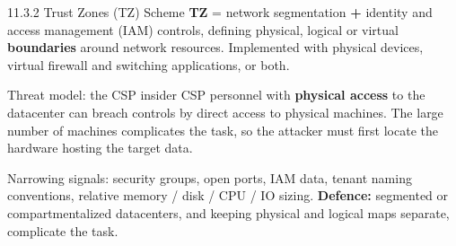 \documentclass[11pt,aspectratio=169]{beamer}
\newcommand{\kw}[1]{\textbf{\color{accent}#1}}
\begin{document}
\begin{frame}{11.3.2 Trust Zones (TZ) Scheme}
  \small
  \kw{TZ} = network segmentation \textbf{+} identity and access management
  (IAM) controls, defining physical, logical or virtual \kw{boundaries} around
  network resources. Implemented with physical devices, virtual firewall and
  switching applications, or both.
  \vspace{0.7em}

  \begin{block}{Threat model: the CSP insider}
    \scriptsize
    CSP personnel with \kw{physical access} to the datacenter can breach
    controls by direct access to physical machines. The large number of
    machines complicates the task, so the attacker must first locate the
    hardware hosting the target data.
  \end{block}
  \vspace{0.5em}

  \begin{center}
  \end{center}
  \vspace{0.4em}

  {\scriptsize\color{accentmid}
  Narrowing signals: security groups, open ports, IAM data, tenant naming
  conventions, relative memory / disk / CPU / IO sizing.
  \textbf{Defence:} segmented or compartmentalized datacenters, and keeping
  physical and logical maps separate, complicate the task.}
\end{frame}
\end{document}

